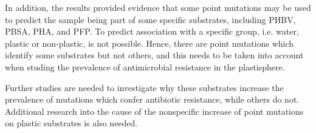 In addition, the results provided evidence that some point mutations may be used to predict the sample being part of some specific substrates, including PHBV, PBSA, PHA, and PFP. To predict association with a specific group, i.e. water, plastic or non-plastic, is not possible.
Hence, there are point mutations which identify some substrates but not others, and this needs to be taken into account when studing the prevalence of antimicrobial resistance in the plastisphere.

Further studies are needed to investigate why these substrates increase the prevalence of mutations which confer antibiotic resistance, while others do not.
Additional research into the cause of the nonspecific increase of point mutations on plastic substrates is also needed. 
